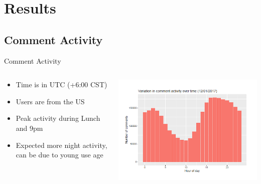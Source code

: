 \documentclass{beamer}
\begin{document}
\section{Results} %

\subsection{Comment Activity}
\begin{frame}{Comment Activity}
\begin{columns}
    \begin{column}{0.4\textwidth}
        \begin{itemize}
            \item Time is in UTC (+6:00 CST)
            \item Users are from the US
            \item Peak activity during Lunch and 9pm
            \item Expected more night activity, can be due to young use age
        \end{itemize}
    \end{column}
    \begin{column}{0.75\textwidth}
        \includegraphics[width=\textwidth]{Plots/commentactivity}
    \end{column}
\end{columns}
\end{frame}
\end{document}
